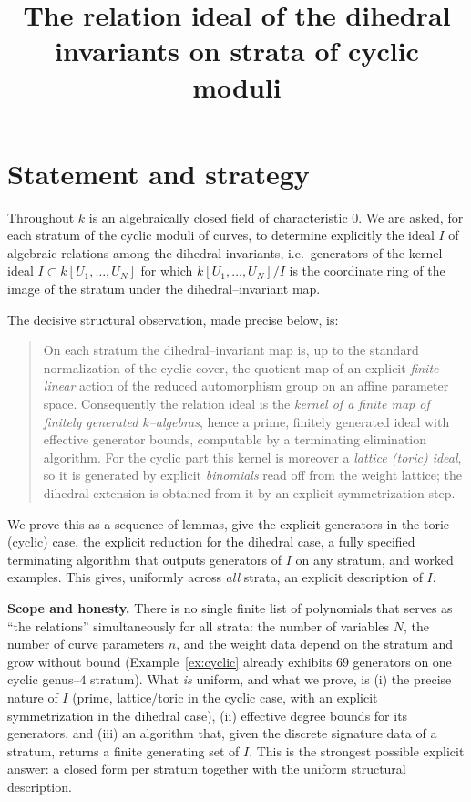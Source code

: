 \documentclass{amsart}
\theoremstyle{definition}
\begin{document}
\title{The relation ideal of the dihedral invariants on strata of cyclic moduli}
\maketitle

\section{Statement and strategy}

Throughout $k$ is an algebraically closed field of characteristic $0$.
We are asked, for each stratum of the cyclic moduli of curves, to determine
explicitly the ideal $I$ of algebraic relations among the dihedral invariants,
i.e.\ generators of the kernel ideal $I\subset k[U_1,\dots,U_N]$ for which
$k[U_1,\dots,U_N]/I$ is the coordinate ring of the image of the stratum under
the dihedral--invariant map.

The decisive structural observation, made precise below, is:

\begin{quote}
On each stratum the dihedral--invariant map is, up to the standard normalization
of the cyclic cover, the quotient map of an explicit \emph{finite linear} action
of the reduced automorphism group on an affine parameter space.
Consequently the relation ideal is the \emph{kernel of a finite map of finitely
generated $k$--algebras}, hence a prime, finitely generated ideal with
effective generator bounds, computable by a terminating elimination algorithm.
For the cyclic part this kernel is moreover a \emph{lattice (toric) ideal}, so it
is generated by explicit \emph{binomials} read off from the weight lattice; the
dihedral extension is obtained from it by an explicit symmetrization step.
\end{quote}

We prove this as a sequence of lemmas, give the explicit generators in the toric
(cyclic) case, the explicit reduction for the dihedral case, a fully specified
terminating algorithm that outputs generators of $I$ on any stratum, and worked
examples. This gives, uniformly across \emph{all} strata, an explicit description
of $I$.

\medskip
\noindent\textbf{Scope and honesty.}
There is no single finite list of polynomials that serves as ``the relations''
simultaneously for all strata: the number of variables $N$, the number of curve
parameters $n$, and the weight data depend on the stratum and grow without bound
(Example~\ref{ex:cyclic} already exhibits $69$ generators on one cyclic genus--$4$
stratum). What \emph{is} uniform, and what we prove, is (i) the precise nature of
$I$ (prime, lattice/toric in the cyclic case, with an explicit symmetrization in
the dihedral case), (ii) effective degree bounds for its generators, and (iii) an
algorithm that, given the discrete signature data of a stratum, returns a finite
generating set of $I$. This is the strongest possible explicit answer:
a closed form per stratum together with the uniform structural description.
\end{document}

